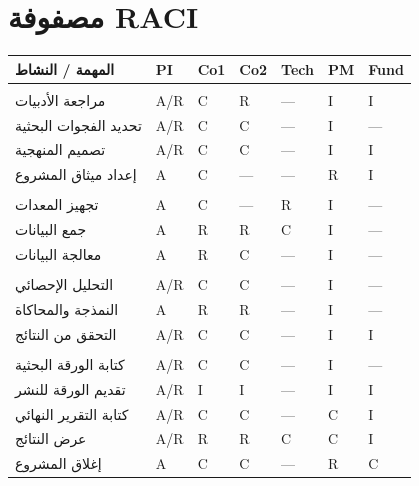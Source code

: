 \documentclass[11pt,a4paper]{article}
\begin{document}
\section{مصفوفة RACI}
\label{sec:raci_matrix}

\begin{table}[H]
\centering
\small
\renewcommand{\arraystretch}{1.4}
\begin{tabularx}{\textwidth}{L{5cm} C{1.2cm} C{1.2cm} C{1.2cm} C{1.2cm} C{1.2cm} C{1.2cm}}
\toprule
\textbf{المهمة / النشاط} & \textbf{PI} & \textbf{Co1} & \textbf{Co2} & \textbf{Tech} & \textbf{PM} & \textbf{Fund} \\
\midrule
{}
 \\
مراجعة الأدبيات & A/R & C & R & --- & I & I \\
تحديد الفجوات البحثية & A/R & C & C & --- & I & --- \\
تصميم المنهجية & A/R & C & C & --- & I & I \\
إعداد ميثاق المشروع & A & C & --- & --- & R & I \\
\midrule
{}
 \\
تجهيز المعدات & A & C & --- & R & I & --- \\
جمع البيانات & A & R & R & C & I & --- \\
معالجة البيانات & A & R & C & --- & I & --- \\
\midrule
{}
 \\
التحليل الإحصائي & A/R & C & C & --- & I & --- \\
النمذجة والمحاكاة & A & R & R & --- & I & --- \\
التحقق من النتائج & A/R & C & C & --- & I & I \\
\midrule
{}
 \\
كتابة الورقة البحثية & A/R & C & C & --- & I & --- \\
تقديم الورقة للنشر & A/R & I & I & --- & I & I \\
كتابة التقرير النهائي & A/R & C & C & --- & C & I \\
عرض النتائج & A/R & R & R & C & C & I \\
إغلاق المشروع & A & C & C & --- & R & C \\
\bottomrule
\end{tabularx}
\end{table}
\end{document}

